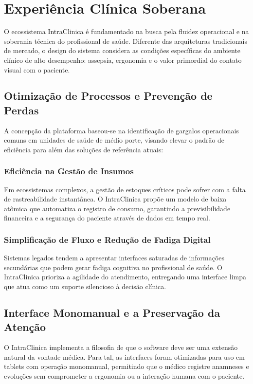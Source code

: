 \chapter{Experiência Clínica Soberana}

O ecossistema IntraClinica é fundamentado na busca pela fluidez operacional e na soberania técnica do profissional de saúde. Diferente das arquiteturas tradicionais de mercado, o design do sistema considera as condições específicas do ambiente clínico de alto desempenho: assepsia, ergonomia e o valor primordial do contato visual com o paciente.

\section{Otimização de Processos e Prevenção de Perdas}

A concepção da plataforma baseou-se na identificação de gargalos operacionais comuns em unidades de saúde de médio porte, visando elevar o padrão de eficiência para além das soluções de referência atuais:

\subsection{Eficiência na Gestão de Insumos}
Em ecossistemas complexos, a gestão de estoques críticos pode sofrer com a falta de rastreabilidade instantânea. O IntraClinica propõe um modelo de baixa atômica que automatiza o registro de consumo, garantindo a previsibilidade financeira e a segurança do paciente através de dados em tempo real.

\subsection{Simplificação de Fluxo e Redução de Fadiga Digital}
Sistemas legados tendem a apresentar interfaces saturadas de informações secundárias que podem gerar fadiga cognitiva no profissional de saúde. O IntraClinica prioriza a agilidade do atendimento, entregando uma interface limpa que atua como um suporte silencioso à decisão clínica.

\section{Interface Monomanual e a Preservação da Atenção}

O IntraClinica implementa a filosofia de que o software deve ser uma extensão natural da vontade médica. Para tal, as interfaces foram otimizadas para uso em tablets com operação monomanual, permitindo que o médico registre anamneses e evoluções sem comprometer a ergonomia ou a interação humana com o paciente.
